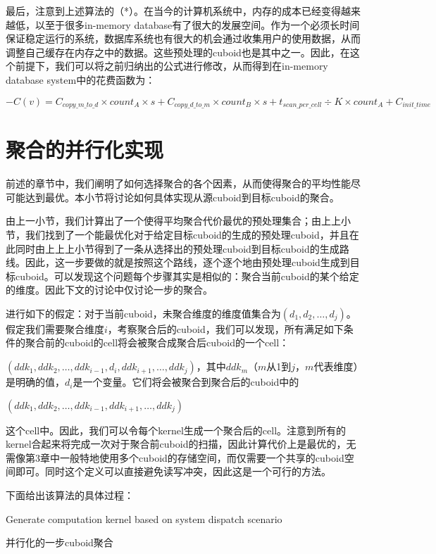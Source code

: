 最后，注意到上述算法的（*）。在当今的计算机系统中，内存的成本已经变得越来越低，以至于很多in-memory database有了很大的发展空间。作为一个必须长时间保证稳定运行的系统，数据库系统也有很大的机会通过收集用户的使用数据，从而调整自己缓存在内存之中的数据。这些预处理的cuboid也是其中之一。因此，在这个前提下，我们可以将之前归纳出的公式进行修改，从而得到在in-memory database system中的花费函数为：
\begin{definition}
$- C(v) = C_{copy\_m\_to\_d} \times count_A \times s + C_{copy\_d\_to\_m} \times count_B \times s + t_{scan\_per\_cell} \div K \times count_A + C_{init\_time}$
\end{definition}


\section{聚合的并行化实现}
前述的章节中，我们阐明了如何选择聚合的各个因素，从而使得聚合的平均性能尽可能达到最优。本小节将讨论如何具体实现从源cuboid到目标cuboid的聚合。

由上一小节，我们计算出了一个使得平均聚合代价最优的预处理集合；由上上小节，我们找到了一个能最优化对于给定目标cuboid的生成的预处理cuboid，并且在此同时由上上上小节得到了一条从选择出的预处理cuboid到目标cuboid的生成路线。因此，这一步要做的就是按照这个路线，逐个逐个地由预处理cuboid生成到目标cuboid。可以发现这个问题每个步骤其实是相似的：聚合当前cuboid的某个给定的维度。因此下文的讨论中仅讨论一步的聚合。

进行如下的假定：对于当前cuboid，未聚合维度的维度值集合为$(d_1, d_2, …, d_j)$。假定我们需要聚合维度$i$，考察聚合后的cuboid，我们可以发现，所有满足如下条件的聚合前的cuboid的cell将会被聚合成聚合后cuboid的一个cell：

$(ddk_1, ddk_2, …, ddk_{i-1}, d_i, ddk_{i+1}, …, ddk_j)$，其中$ddk_m$（$m$从1到$j$，$m$代表维度）是明确的值，$d_i$是一个变量。它们将会被聚合到聚合后的cuboid中的

$(ddk_1, ddk_2, …, ddk_{i-1}, ddk_{i+1}, …, ddk_j)$

这个cell中。因此，我们可以令每个kernel生成一个聚合后的cell。注意到所有的kernel合起来将完成一次对于聚合前cuboid的扫描，因此计算代价上是最优的，无需像第3章中一般特地使用多个cuboid的存储空间，而仅需要一个共享的cuboid空间即可。同时这个定义可以直接避免读写冲突，因此这是一个可行的方法。

下面给出该算法的具体过程：
\begin{algorithm}[htbp]
\SetAlgoLined
{}
Generate computation kernel based on system dispatch scenario\;
\caption{并行化的一步cuboid聚合}
\label{algo:algorithm6}
\end{algorithm}


